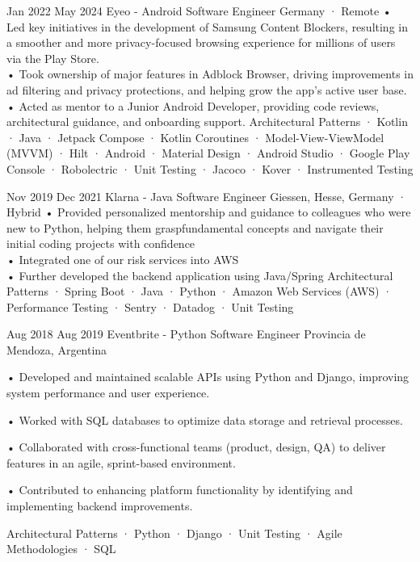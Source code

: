 \documentclass[a4paper,nocolors]{friggeri-cv}
\begin{document}
\begin{entrylist}

\entryexperience
{Jan 2022}
{May 2024}
{Eyeo - Android Software Engineer}
{Germany · Remote}
{
• Led key initiatives in the development of Samsung Content Blockers, resulting in a smoother and more privacy-focused browsing experience for millions of users via the Play Store.
\\
• Took ownership of major features in Adblock Browser, driving improvements in ad filtering and privacy protections, and helping grow the app’s active user base.
\\
• Acted as mentor to a Junior Android Developer, providing code reviews, architectural guidance, and onboarding support.
}
{
  Architectural Patterns · Kotlin · Java · Jetpack Compose · Kotlin Coroutines · Model-View-ViewModel (MVVM) · Hilt · Android · Material Design · Android Studio · Google Play Console · Robolectric · Unit Testing · Jacoco · Kover · Instrumented Testing
}


\entryexperience
{Nov 2019}
{Dec 2021}
{Klarna - Java Software Engineer}
{Giessen, Hesse, Germany · Hybrid}
{
  • Provided personalized mentorship and guidance to colleagues who were new to Python, helping them graspfundamental concepts and navigate their initial coding projects with confidence
  \\
  • Integrated one of our risk services into AWS
  \\
  • Further developed the backend application using Java/Spring
}
{ 
  Architectural Patterns · Spring Boot  · Java · Python · Amazon Web Services (AWS) · Performance Testing · Sentry · Datadog · Unit Testing
}


\entryexperience
{Aug 2018}
{Aug 2019}
{Eventbrite - Python Software Engineer}
{Provincia de Mendoza, Argentina}
{
  • Developed and maintained scalable APIs using Python and Django, improving system performance and user experience.

  • Worked with SQL databases to optimize data storage and retrieval processes.

  • Collaborated with cross-functional teams (product, design, QA) to deliver features in an agile, sprint-based environment.

  • Contributed to enhancing platform functionality by identifying and implementing backend improvements.
}
{
  Architectural Patterns · Python · Django · Unit Testing · Agile Methodologies · SQL
}


\end{entrylist}
\end{document}
